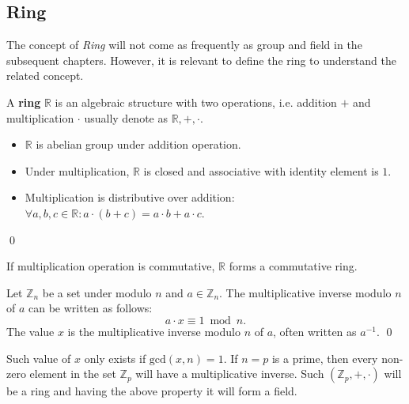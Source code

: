 \subsection{Ring}
The concept of \textit{Ring} will not come as frequently as group and field in the subsequent chapters. 
However, it is relevant to define the ring to understand the related concept.
\begin{definition}
	A \textbf{ring} $\mathbb{R}$ is an algebraic structure with two operations, i.e. addition  $+$ and  multiplication $\cdot$  usually denote as $\mathbb{R},+,\cdot$.
	\begin{itemize}
		\item $\mathbb{R}$ is abelian group under addition operation.
		\item Under multiplication, $\mathbb{R}$ is closed and associative with identity element is $1$.
		\item  Multiplication is distributive over addition: $ \forall a, b, c \in \mathbb{R}: a\cdot (b+c) = a\cdot b + a\cdot c$.
	\end{itemize}
	\qed
\end{definition}
If multiplication operation is commutative, $\mathbb{R}$  forms a commutative ring.
\begin{definition}
	Let $\mathbb{Z}_n$ be a set under modulo $n$ and $a \in \mathbb{Z}_n$. 
	The multiplicative inverse modulo $n$ of $a$ can be written as  follows:
	$$a\cdot x \equiv  1 \bmod n.$$
	The value $x$ is the multiplicative inverse modulo $n$ of $a$, often written as $a^{-1}$.
	\qed
\end{definition}
Such value of $x$ only exists if $\text{gcd}(x,n)=1$.
If $n=p$ is a prime, then every non-zero element in the set $\mathbb{Z}_p$ will have a multiplicative inverse.
Such $(\mathbb{Z}_p,+,\cdot)$ will be a ring and having the above property it will form a field.

